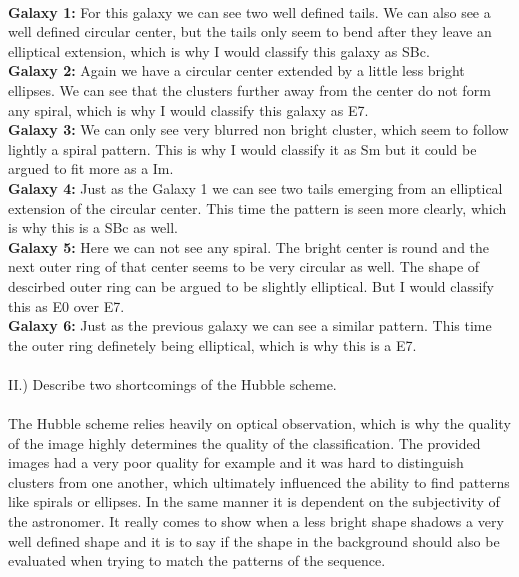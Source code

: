 \\
\textbf{Galaxy 1:} For this galaxy we can see two well defined tails. We can also see a well defined 
circular center, but the tails only seem to bend after they leave an elliptical extension, which is why
I would classify this galaxy as SBc.\\
\textbf{Galaxy 2:} Again we have a circular center extended by a little less bright ellipses. We can see
that the clusters further away from the center do not form any spiral, which is why I would classify this
galaxy as E7.\\
\textbf{Galaxy 3:} We can only see very blurred non bright cluster, which seem to follow lightly a spiral
pattern. This is why I would classify it as Sm but it could be argued to fit more as a Im.\\
\textbf{Galaxy 4:} Just as the Galaxy 1 we can see two tails emerging from an elliptical extension of the
circular center. This time the pattern is seen more clearly, which is why this is a SBc as well.\\
\textbf{Galaxy 5:} Here we can not see any spiral. The bright center is round and the next outer ring of
that center seems to be very circular as well. The shape of descirbed outer ring can be argued to be
slightly elliptical. But I would classify this as E0 over E7.\\
\textbf{Galaxy 6:} Just as the previous galaxy we can see a similar pattern. This time the outer ring
definetely being elliptical, which is why this is a E7.\\
\\
II.) Describe two shortcomings of the Hubble scheme.\\
\\
The Hubble scheme relies heavily on optical observation, which is why the quality of the image highly
determines the quality of the classification. The provided images had a very poor quality for example and
it was hard to distinguish clusters from one another, which ultimately influenced the ability to find 
patterns like spirals or ellipses. In the same manner it is dependent on the subjectivity of the 
astronomer. It really comes to show when a less bright shape shadows a very well defined shape and it is 
to say if the shape in the background should also be evaluated when trying to match the patterns of the
sequence.
